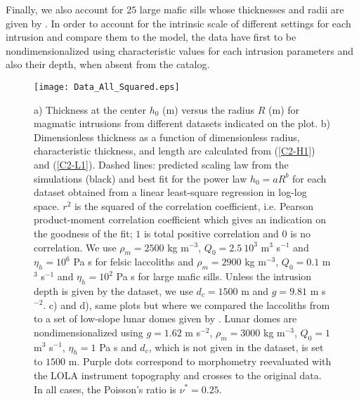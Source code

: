Finally, we also account for  $25$ large mafic sills whose thicknesses
and radii are given by \citet{Cruden:tg}.  In order to account for the
intrinsic scale of  different settings for each  intrusion and compare
them to the model, the data  have first to be nondimensionalized using
characteristic  values for  each intrusion  parameters and  also their
depth, when absent from the catalog.

\begin{figure}[htpb]
  \begin{center}
    \graphicspath{ {/Users/thorey/Documents/These/Projet/Refroidissement/Skin_Model/Figure/Figure_Data/} }
    \texttt{[image: Data\_All\_Squared.eps]}
    \caption{a) Thickness  at the center  $h_0$ (m) versus  the radius
      $R$  (m)   for  magmatic  intrusions  from   different  datasets
      indicated on the plot. b)  Dimensionless thickness as a function
      of  dimensionless radius,  characteristic thickness,  and length
      are  calculated from  (\ref{C2-H1})  and (\ref{C2-L1}).   Dashed
      lines: predicted  scaling law  from the simulations  (black) and
      best fit for the power  law $h_0=aR^b$ for each dataset obtained
      from a  linear least-square regression in  log-log space.  $r^2$
      is  the squared  of the  correlation coefficient,  i.e.  Pearson
      product-moment correlation coefficient which gives an indication
      on the  goodness of the  fit; $1$ is total  positive correlation
      and $0$  is no correlation.   We use $\rho_m=2500$  kg m$^{-3}$,
      $Q_0 =2.5~10^3$ m$^3$ s$^{-1}$ and $\eta_h=10^6$ Pa s for felsic
      laccoliths  and  $\rho_m=2900$  kg m$^{-3}$,  $Q_0  =0.1$  m$^3$
      s$^{-1}$ and $\eta_h=10^2$  Pa s for large  mafic sills.  Unless
      the intrusion depth is given by the dataset, we use $d_c=1500$ m
      and $g=9.81$  m s$^{-2}$.  c)  and d),  same plots but  where we
      compared the  laccoliths from \citet{Rocchi:2002jy} to  a set of
      low-slope  lunar domes  given  by \citet{Wohler:2009jj}.   Lunar
      domes   are  nondimensionalized   using  $g=1.62$   m  s$^{-2}$,
      $\rho_m=3000$ kg  m$^{-3}$, $Q_0 =1$ m$^3$  s$^{-1}$, $\eta_h=1$
      Pa s  and $d_c$, which  is not given in  the dataset, is  set to
      $1500$ m. Purple dots correspond to morphometry reevaluated with
      the  LOLA  instrument topography  and  crosses  to the  original
      data. In all cases, the Poisson's ratio is $\nu^*=0.25$.}
    \label{C2-Corry_Rocchie}
  \end{center}
\end{figure}



